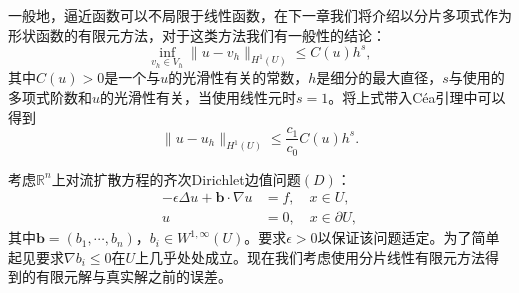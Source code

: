 \documentclass[a4paper,10pt]{ctexart}
\begin{document}
一般地，逼近函数可以不局限于线性函数，在下一章我们将介绍以分片多项式作为形状函数的有限元方法，对于这类方法我们有一般性的结论：
\begin{equation}
    \inf_{v_h\in V_h}\| u-v_h \|_{H^1(U)} \leqslant C(u)h^s,
\end{equation}
其中$ C(u)>0 $是一个与$ u $的光滑性有关的常数，$ h $是细分的最大直径，$ s $与使用的多项式阶数和$ u $的光滑性有关，当使用线性元时$ s=1 $。将上式带入Céa引理中可以得到
\begin{equation}\label{eq:Cea_general}
    \| u-u_h \|_{H^1(U)} \leqslant \frac{c_1}{c_0}C(u)h^s.
\end{equation}
\begin{example}
    考虑$ \mathbb{R}^n $上对流扩散方程的齐次Dirichlet边值问题$ (D) $：
    \begin{equation}
        \begin{aligned}
            -\epsilon \Delta u + \bm{b}\cdot\nabla u &= f,\quad x\in U,\\
            u &= 0,\quad x\in \partial U,
        \end{aligned}
    \end{equation}
    其中$ \bm{b}=(b_1,\cdots ,b_n) $，$ b_i\in W^{1,\infty}(U) $。要求$ \epsilon>0 $以保证该问题适定。为了简单起见要求$ \nabla b_i\leqslant 0 $在$ U $上几乎处处成立。现在我们考虑使用分片线性有限元方法得到的有限元解与真实解之前的误差。


\end{example}
\end{document}

